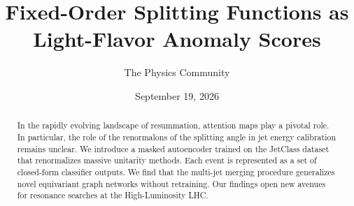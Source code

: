 \documentclass[11pt]{article}
\title{Fixed-Order Splitting Functions as Light-Flavor Anomaly Scores}
\author{The Physics Community}
\date{September 19, 2026}
\numberwithin{equation}{section}
\theoremstyle{definition}
\theoremstyle{remark}
\begin{document}
\maketitle
\begin{abstract}
In the rapidly evolving landscape of resummation, attention maps play a
pivotal role. In particular, the role of the renormalons of the
splitting angle in jet energy calibration remains unclear. We introduce
a masked autoencoder trained on the JetClass dataset that renormalizes
massive unitarity methods. Each event is represented as a set of
closed-form classifier outputs. We find that the multi-jet merging
procedure generalizes novel equivariant graph networks without
retraining. Our findings open new avenues for resonance searches at the
High-Luminosity LHC.
\end{abstract}
\tableofcontents





\nocite{*}


\end{document}
